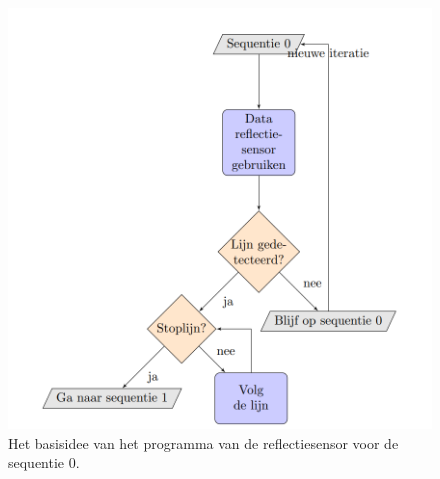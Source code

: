 \documentclass[a4paper,twoside,kulak]{kulakreport} %
\begin{document}
%	

\begin{figure}
	\centering
	\includegraphics[width=.7\textwidth]{flowchart_sequentie0}
	\caption{Het basisidee van het programma van de reflectiesensor voor de sequentie 0.}
	\label{reflectiesensorValueZero}
\end{figure}
\end{document}

